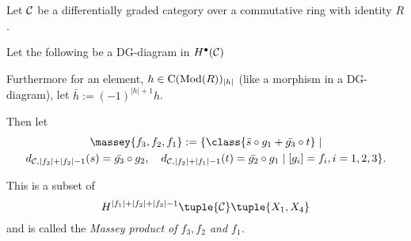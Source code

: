 \begin{definition}
    \label{def:massey_product_dg_cat}
    Let \( {\mathcal{C}} \) be a differentially graded category over a commutative ring with identity \( R \).

    Let the following be a DG-diagram in \( H^\bullet({\mathcal{C}}) \)
    \begin{center}
    \end{center}

    Furthermore for an element, \( h \in \operatorname{C}(\operatorname{Mod}(R))_{|h|} \) (like a morphism in a DG-diagram), let \( \bar{h} := (-1)^{|h| + 1}h \).


    Then let
    \begin{multline*}
        \massey{f_3, f_2, f_1 } :=
        \{
            \class{
                \bar{s} \circ g_1 + \bar{g_3} \circ t
            }
            \mid \\
            d_{\Cc, |f_3| + |f_2| - 1}(s) = \bar{g_3} \circ g_2, \quad
            d_{\Cc, |f_2| + |f_1| - 1}(t) = \bar{g_2} \circ g_1
            \mid
            [g_i] = f_i, i = 1,2,3
        \}.
    \end{multline*}

    This is a subset of
    \[
        H^{|f_1| + |f_2| + |f_3| - 1}\tuple{\Cc}\tuple{X_1, X_4}
    \]
    and is called the \emph{Massey product of \( f_3, f_2 \) and \( f_1 \)}.
\end{definition}

